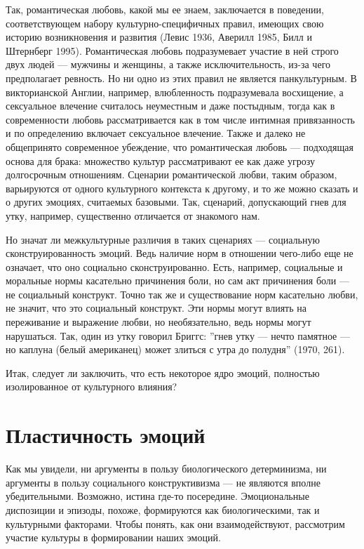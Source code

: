 \documentclass[11pt]{book}
\begin{document}
Так, романтическая любовь, какой мы ее знаем, заключается в поведении, соответствующем набору культурно-специфичных правил, имеющих свою историю возникновения и развития (Левис 1936, Аверилл 1985, Билл и Штернберг 1995). Романтическая любовь подразумевает участие в ней строго двух людей --- мужчины и женщины, а также исключительность, из-за чего предполагает ревность. Но ни одно из этих правил не является панкультурным. В викторианской Англии, например, влюбленность подразумевала восхищение, а сексуальное влечение считалось неуместным и даже постыдным, тогда как в современности любовь рассматривается как в том числе интимная привязанность и по определению включает сексуальное влечение. Также и далеко не общепринято современное убеждение, что романтическая любовь --- подходящая основа для брака: множество культур рассматривают ее как даже угрозу долгосрочным отношениям. Сценарии романтической любви, таким образом, варьируются от одного культурного контекста к другому, и то же можно сказать и о других эмоциях, считаемых базовыми. Так, сценарий, допускающий гнев для утку, например, существенно отличается от знакомого нам.

Но значат ли межкультурные различия в таких сценариях --- социальную сконструированность эмоций. Ведь наличие норм в отношении чего-либо еще не означает, что оно социально сконструированно. Есть, например, социальные и моральные нормы касательно причинения боли, но сам акт причинения боли --- не социальный конструкт. Точно так же и существование норм касательно любви, не значит, что это социальный конструкт. Эти нормы могут влиять на переживание и выражение любви, но необязательно, ведь нормы могут нарушаться. Так, один из утку говорил Бриггс: ''гнев утку --- нечто памятное --- но каплуна (белый американец) может злиться с утра до полудня'' (1970, 261).

Итак, следует ли заключить, что есть некоторое ядро эмоций, полностью изолированное от культурного влияния?

\section{Пластичность эмоций}

Как мы увидели, ни аргументы в пользу биологического детерминизма, ни аргументы в пользу социального конструктивизма --- не являются вполне убедительными. Возможно, истина где-то посередине. Эмоциональные диспозиции и эпизоды, похоже, формируются как биологическими, так и культурными факторами. Чтобы понять, как они взаимодействуют, рассмотрим участие культуры в формировании наших эмоций.
\end{document}
